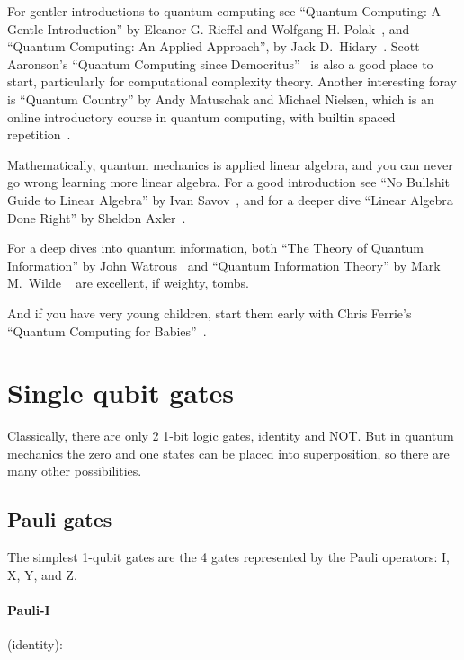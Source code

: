 \documentclass[article,pagebackref]{bespoke5}
\begin{document}
For gentler introductions to quantum computing see ``Quantum Computing: A Gentle Introduction'' by Eleanor G. Rieffel and Wolfgang H. Polak~\cite{Rieffel2014a}, and ``Quantum Computing: An Applied Approach'',
by Jack D.~Hidary~\cite{Hidary2019a}. Scott Aaronson's ``Quantum Computing since Democritus''~\cite{Aaronson2013a} is also a good place to start, particularly for computational complexity theory.  Another interesting foray is ``Quantum Country'' by Andy Matuschak and Michael Nielsen, which is an online introductory course in quantum computing, with builtin spaced repetition~\cite{QuantumCountry}.

Mathematically, quantum mechanics is applied linear algebra, and you can never go wrong learning more linear algebra. For a good introduction see ``No Bullshit Guide to Linear Algebra'' by Ivan Savov~\cite{Savov2017a}, and for a deeper dive ``Linear Algebra Done Right'' by Sheldon Axler~\cite{Axler2004a}.


For a deep dives into quantum information, both ``The Theory of Quantum Information'' by John Watrous~\cite{Watrous2018a} and ``Quantum Information Theory'' by Mark M.~Wilde ~\cite{Wilde2017a} are excellent, if weighty, tombs.

And if you have very young children, start them early with Chris Ferrie's ``Quantum Computing for Babies''~\cite{Ferrie2018a}.




\section{Single qubit gates}

Classically, there are only 2 1-bit logic gates, identity and NOT. But in quantum mechanics the zero and one states can be placed into superposition, so there are many other possibilities. 

\subsection{Pauli gates}
The simplest 1-qubit gates are the 4 gates represented by the Pauli operators: I, X, Y, and Z.




\paragraph{Pauli-I} (identity):
\end{document}
